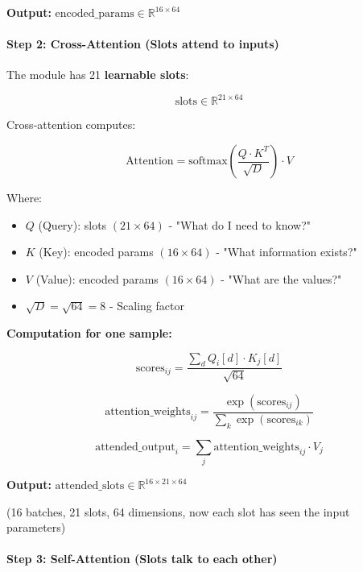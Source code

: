 \documentclass[11pt,a4paper]{article}
\begin{document}
\textbf{Output:} $\text{encoded\_params} \in \mathbb{R}^{16 \times 64}$

\paragraph{Step 2: Cross-Attention (Slots attend to inputs)}

The module has 21 \textbf{learnable slots}:

\begin{equation}
\text{slots} \in \mathbb{R}^{21 \times 64}
\end{equation}

Cross-attention computes:

\begin{equation}
\text{Attention} = \text{softmax}\left(\frac{Q \cdot K^T}{\sqrt{D}}\right) \cdot V
\end{equation}

Where:
\begin{itemize}
  \item $Q$ (Query): slots $(21 \times 64)$ - "What do I need to know?"
  \item $K$ (Key): encoded params $(16 \times 64)$ - "What information exists?"
  \item $V$ (Value): encoded params $(16 \times 64)$ - "What are the values?"
  \item $\sqrt{D} = \sqrt{64} = 8$ - Scaling factor
\end{itemize}

\textbf{Computation for one sample:}

\begin{equation}
\text{scores}_{ij} = \frac{\sum_d Q_i[d] \cdot K_j[d]}{\sqrt{64}}
\end{equation}

\begin{equation}
\text{attention\_weights}_{ij} = \frac{\exp(\text{scores}_{ij})}{\sum_k \exp(\text{scores}_{ik})}
\end{equation}

\begin{equation}
\text{attended\_output}_i = \sum_j \text{attention\_weights}_{ij} \cdot V_j
\end{equation}

\textbf{Output:} $\text{attended\_slots} \in \mathbb{R}^{16 \times 21 \times 64}$

(16 batches, 21 slots, 64 dimensions, now each slot has seen the input parameters)

\paragraph{Step 3: Self-Attention (Slots talk to each other)}
\end{document}
